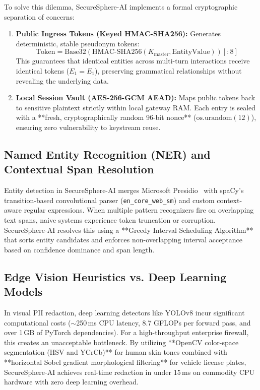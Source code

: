 To solve this dilemma, SecureSphere-AI implements a formal cryptographic separation of concerns:
\begin{enumerate}[leftmargin=*]
    \item \textbf{Public Ingress Tokens (Keyed HMAC-SHA256):} Generates deterministic, stable pseudonym tokens:
    \begin{equation}
    \text{Token} = \text{Base32}(\text{HMAC-SHA256}(K_{\text{master}}, \text{EntityValue}))[:8]
    \end{equation}
    This guarantees that identical entities across multi-turn interactions receive identical tokens ($E_1 = E_1$), preserving grammatical relationships without revealing the underlying data.
    \item \textbf{Local Session Vault (AES-256-GCM AEAD):} Maps public tokens back to sensitive plaintext strictly within local gateway RAM. Each entry is sealed with a **fresh, cryptographically random 96-bit nonce** ($\text{os.urandom}(12)$), ensuring zero vulnerability to keystream reuse.
\end{enumerate}

\subsection{Named Entity Recognition (NER) and Contextual Span Resolution}
Entity detection in SecureSphere-AI merges Microsoft Presidio~\cite{presidio2021} with spaCy's transition-based convolutional parser (\texttt{en\_core\_web\_sm}) and custom context-aware regular expressions. When multiple pattern recognizers fire on overlapping text spans, naive systems experience token truncation or corruption. SecureSphere-AI resolves this using a **Greedy Interval Scheduling Algorithm** that sorts entity candidates and enforces non-overlapping interval acceptance based on confidence dominance and span length.

\subsection{Edge Vision Heuristics vs. Deep Learning Models}
In visual PII redaction, deep learning detectors like YOLOv8 incur significant computational costs ($\sim$250\,ms CPU latency, 8.7 GFLOPs per forward pass, and over 1\,GB of PyTorch dependencies). For a high-throughput enterprise firewall, this creates an unacceptable bottleneck. By utilizing **OpenCV color-space segmentation (HSV and YCrCb)** for human skin tones combined with **horizontal Sobel gradient morphological filtering** for vehicle license plates, SecureSphere-AI achieves real-time redaction in under 15\,ms on commodity CPU hardware with zero deep learning overhead.

